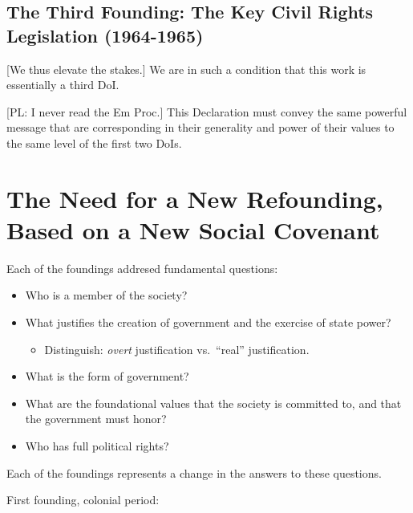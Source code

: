 \documentclass[
]{book}
\providecommand{\tightlist}{%
  \setlength{\itemsep}{0pt}\setlength{\parskip}{0pt}}
\begin{document}
\hypertarget{the-third-founding-the-key-civil-rights-legislation-1964-1965}{%
\subsection{The Third Founding: The Key Civil Rights Legislation (1964-1965)}\label{the-third-founding-the-key-civil-rights-legislation-1964-1965}}

{[}We thus elevate the stakes.{]} We are in such a condition that this work is essentially a third DoI.

{[}PL: I never read the Em Proc.{]} This Declaration must convey the same powerful message that are corresponding in their generality and power of their values to the same level of the first two DoIs.

\hypertarget{the-need-for-a-new-refounding-based-on-a-new-social-covenant}{%
\section{The Need for a New Refounding, Based on a New Social Covenant}\label{the-need-for-a-new-refounding-based-on-a-new-social-covenant}}

Each of the foundings addresed fundamental questions:

\begin{itemize}
\item
  Who is a member of the society?
\item
  What justifies the creation of government and the exercise of state power?

  \begin{itemize}
  \tightlist
  \item
    Distinguish: \emph{overt} justification vs.~``real'' justification.
  \end{itemize}
\item
  What is the form of government?
\item
  What are the foundational values that the society is committed to, and that the government must honor?
\item
  Who has full political rights?
\end{itemize}

Each of the foundings represents a change in the answers to these questions.

First founding, colonial period:
\end{document}
